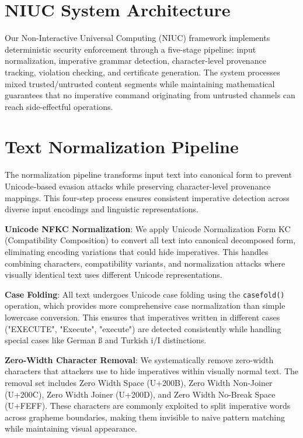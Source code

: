 \section{NIUC System Architecture}

Our Non-Interactive Universal Computing (NIUC) framework implements deterministic security enforcement through a five-stage pipeline: input normalization, imperative grammar detection, character-level provenance tracking, violation checking, and certificate generation. The system processes mixed trusted/untrusted content segments while maintaining mathematical guarantees that no imperative command originating from untrusted channels can reach side-effectful operations.

\section{Text Normalization Pipeline}

The normalization pipeline transforms input text into canonical form to prevent Unicode-based evasion attacks while preserving character-level provenance mappings. This four-step process ensures consistent imperative detection across diverse input encodings and linguistic representations.

\textbf{Unicode NFKC Normalization}: We apply Unicode Normalization Form KC (Compatibility Composition) to convert all text into canonical decomposed form, eliminating encoding variations that could hide imperatives. This handles combining characters, compatibility variants, and normalization attacks where visually identical text uses different Unicode representations.

\textbf{Case Folding}: All text undergoes Unicode case folding using the \texttt{casefold()} operation, which provides more comprehensive case normalization than simple lowercase conversion. This ensures that imperatives written in different cases ("EXECUTE", "Execute", "execute") are detected consistently while handling special cases like German ß and Turkish i/I distinctions.

\textbf{Zero-Width Character Removal}: We systematically remove zero-width characters that attackers use to hide imperatives within visually normal text. The removal set includes Zero Width Space (U+200B), Zero Width Non-Joiner (U+200C), Zero Width Joiner (U+200D), and Zero Width No-Break Space (U+FEFF). These characters are commonly exploited to split imperative words across grapheme boundaries, making them invisible to naive pattern matching while maintaining visual appearance.

